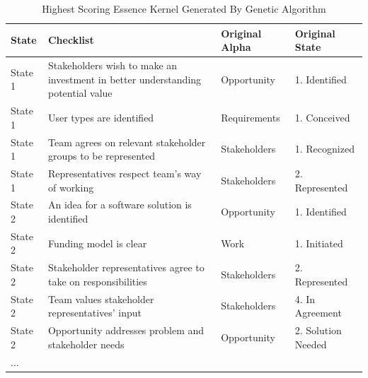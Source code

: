 \documentclass[3p,times,procedia]{elsarticle}
\begin{document}
\begin{table}[h]
\caption{Highest Scoring Essence Kernel Generated By Genetic Algorithm}
\label{BestResults}
\centering
\begin{tabular}{p{0.50in}p{2.80in}p{1.00in}p{1.40in}}
\hline
State & Checklist & Original \mbox{Alpha} & Original State \\ \hline
State 1 & Stakeholders wish to make an investment in better understanding potential value & Opportunity & 1. Identified \\ 
State 1 & User types are identified & Requirements & 1. Conceived \\ 
State 1 & Team agrees on relevant stakeholder groups to be represented & Stakeholders & 1. Recognized \\ 
State 1 & Representatives respect team's way of working  & Stakeholders & 2. Represented \\
State 2 & An idea for a software solution is identified & Opportunity & 1. Identified \\ 
State 2 & Funding model is clear & Work & 1. Initiated \\ 
State 2 & Stakeholder representatives agree to take on responsibilities & Stakeholders & 2. Represented \\ 
State 2 & Team values stakeholder representatives' input & Stakeholders & 4. In Agreement \\
State 2 & Opportunity addresses problem and stakeholder needs & Opportunity & 2. Solution Needed \\
... &  & \\ \hline
\end{tabular}
\end{table}




\end{document}
